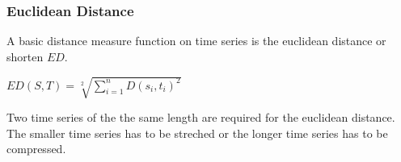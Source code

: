 \subsubsection{Euclidean Distance}
A basic distance measure function on time series is the euclidean distance or shorten $ED$.
\begin{center}
    $ED(S, T) = \sqrt[2]{\sum \limits_{i=1}^{n} D(s_i, t_i)^2}$
\end{center}
Two time series of the the same length are required for the euclidean distance. The smaller time series has to be
streched or the longer time series has to be compressed.

